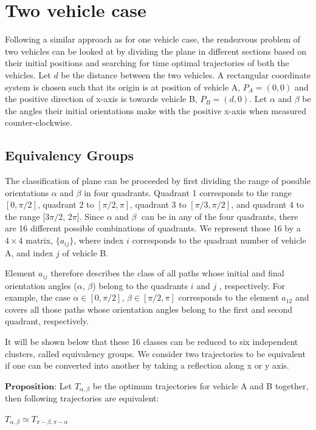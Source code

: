 \documentclass[11pt]{article} %
\begin{document}
\section{Two vehicle case}
Following a similar approach as for one vehicle case, the rendezvous problem of two vehicles can be looked at by dividing the plane in different sections based on their initial positions and searching for time optimal trajectories of both the vehicles. Let $d$ be the distance between the two vehicles. A rectangular coordinate system is chosen such that its origin is at position of vehicle A, $P_A =  (0,0)$ and the positive direction of x-axis is towards vehicle B, $P_B = (d,0)$. Let $\alpha$ and $\beta$ be the angles their initial orientations make with the positive x-axis when measured counter-clockwise. 

\subsection{Equivalency Groups}
The classification of plane can be proceeded by first dividing the range of possible orientations $\alpha$ and $\beta$ in four quadrants. Quadrant 1 corresponds to the range $[0, \pi/2]$, quadrant 2 to $[\pi/2, \pi]$, quadrant 3 to $[\pi/3,\pi/2]$, and quadrant 4 to the range [3$\pi/$2, 2$\pi$]. Since $\alpha$ and $\beta$ can be in any of the four quadrants, there are 16 different possible combinations of quadrants. We represent those 16 by a $4\times4$ matrix, $\{a_{ij}\}$, where index $i$ corresponds to the quadrant number of vehicle A, and index $j$ of vehicle B.

Element $a_{ij}$ therefore describes the class of all paths whose initial and final orientation angles ($\alpha$, $\beta$) belong to the quadrants $i$ and $j$ , respectively. For example, the case $\alpha \in [0, \pi/2]$, $\beta \in [\pi/2, \pi]$ corresponds to the element $a_{12}$ and covers all those paths whose orientation angles belong to the first and second quadrant, respectively.

It will be shown below that these 16 classes can be reduced to six independent clusters, called equivalency groups. We consider two trajectories to be equivalent if one can be converted into another by taking a reflection along x or y axis.

$\textbf{Proposition:}$ Let $T_{\alpha,\beta}$ be the optimum trajectories for vehicle A and B together, then following trajectories are equivalent:

$T_{\alpha,\beta} \simeq T_{\pi-\beta,\pi-\alpha}$
\end{document}
